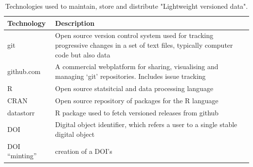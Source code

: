 \documentclass[a4paper,11pt]{article}
\begin{document}
\begin{table}[h!]
\centering
\caption{Technologies used to maintain, store and distribute "Lightweight versioned data".}
{\footnotesize
\vspace{1cm}
  \begin{tabular}{p{5cm}p{10cm}}
  \hline
  \textbf{Technology} & \textbf{Description} \\\hline
   git & Open source version control system used for tracking progressive changes in a set of text files, typically computer code but also data\\
   github.com & A commercial webplatform for sharing, visualising and managing `git' repositories. Includes issue tracking\\
   R     &  Open source statsitcial and data processing language \\
   CRAN  &  Open source repository of packages for the R language \\
   datastorr & R package used to fetch versioned releases from github  \\
   DOI & Digital object identifier, which refers a user to a single stable digital object \\ 
   DOI ``minting'' & creation of a DOI's \\
   \hline
  \end{tabular}
  }
\label{tab:technologies}
\end{table}

\newpage
\end{document}
